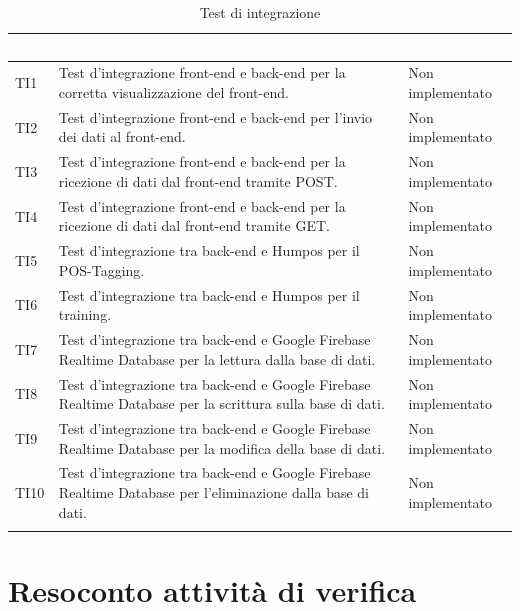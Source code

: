 	\begin{longtable}{|>{\centering\arraybackslash}m{1.6cm}|>{\centering\arraybackslash}m{6.41cm}|>{\centering\arraybackslash}m{3.1cm}|}		
		\rowcolor{LightBlue}
		\textbf{\textcolor{white}{Test}}
		& \multicolumn{1}{|c|}{\textbf{\textcolor{white}{ Descrizione}}}
		& \textbf{\textcolor{white}{Esito}}\\
		\hline
		TI1
		& Test d’integrazione front-end e back-end per la corretta visualizzazione del front-end.
		& Non implementato
		\\ \hline
		\rowcolor{LightGray}
		TI2
		& Test d’integrazione front-end e back-end per l'invio dei dati al front-end.
		& Non implementato
		\\ \hline
		TI3
		& Test d’integrazione front-end e back-end per la ricezione di dati dal front-end tramite POST.
		& Non implementato
		\\ \hline
		\rowcolor{LightGray}
		TI4
		& Test d’integrazione front-end e back-end per la ricezione di dati dal front-end tramite GET.
		& Non implementato
		\\ \hline
		TI5
		& Test d’integrazione tra back-end e Humpos per il POS-Tagging.
		& Non implementato
		\\ \hline
		\rowcolor{LightGray}
		TI6
		& Test d’integrazione tra back-end e Humpos per il training.
		& Non implementato
		\\ \hline	
		TI7
		& Test d’integrazione tra back-end e Google Firebase Realtime Database per la lettura dalla base di dati.
		& Non implementato
		\\ \hline	
		\rowcolor{LightGray}
		TI8
		& Test d’integrazione tra back-end e Google Firebase Realtime Database per la scrittura sulla base di dati.
		& Non implementato
		\\ \hline	
		TI9
		& Test d’integrazione tra back-end e Google Firebase Realtime Database per la modifica della base di dati.
		& Non implementato
		\\ \hline	
		\rowcolor{LightGray}
		TI10
		& Test d’integrazione tra back-end e Google Firebase Realtime Database per l'eliminazione dalla base di dati.
		& Non implementato
		\\ \hline	
		\caption{Test di integrazione}
\end{longtable}


	
\newpage
\section{Resoconto attività di verifica}
